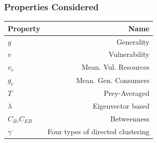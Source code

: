 \documentclass[table]{beamer}
\begin{document}
\begin{frame} 
    \frametitle{Properties Considered}
    \centering
    \begin{tabular}{l r}
        \toprule
            Property&Name\\
            \midrule
            $g$&Generality\\
            $v$&Vulnerability\\
            $v_r$&Mean. Vul. Resources\\
            $g_c$&Mean. Gen. Consumers\\
            $T$&Prey-Averaged\\
            $\lambda$&Eigenvector based\\
            $C_B$,$C_{EB}$&Betweenness\\
            $\gamma^{\cdot}$&Four types of directed clustering\\
            \bottomrule
    \end{tabular}
\end{frame}

\end{document}

